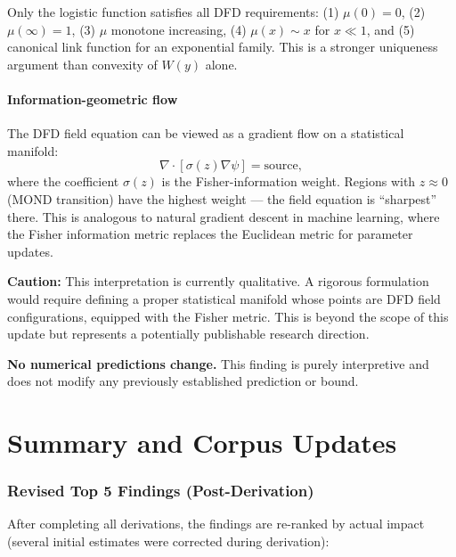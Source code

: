 \documentclass[11pt]{article}
\newcommand{\mufd}{\mu}
\begin{document}
Only the logistic function satisfies all DFD requirements: (1)
$\mufd(0) = 0$, (2) $\mufd(\infty) = 1$, (3) $\mufd$ monotone
increasing, (4) $\mufd(x) \sim x$ for $x \ll 1$, and (5) canonical
link function for an exponential family. This is a stronger
uniqueness argument than convexity of $W(y)$ alone.

\subsection{Information-geometric flow}

The DFD field equation can be viewed as a gradient flow on a
statistical manifold:
\begin{equation}
\nabla\cdot[\sigma(z)\nabla\psi] = \text{source},
\end{equation}
where the coefficient $\sigma(z)$ is the Fisher-information
weight. Regions with $z \approx 0$ (MOND transition) have the
highest weight --- the field equation is ``sharpest'' there. This
is analogous to natural gradient descent in machine learning,
where the Fisher information metric replaces the Euclidean metric
for parameter updates.

\textbf{Caution:} This interpretation is currently qualitative. A
rigorous formulation would require defining a proper statistical
manifold whose points are DFD field configurations, equipped with
the Fisher metric. This is beyond the scope of this update but
represents a potentially publishable research direction.

\textbf{No numerical predictions change.} This finding is purely
interpretive and does not modify any previously established
prediction or bound.


\part{Summary and Corpus Updates}
\label{part:summary}

\section{Revised Top 5 Findings (Post-Derivation)}

After completing all derivations, the findings are re-ranked by
actual impact (several initial estimates were corrected during
derivation):
\end{document}
